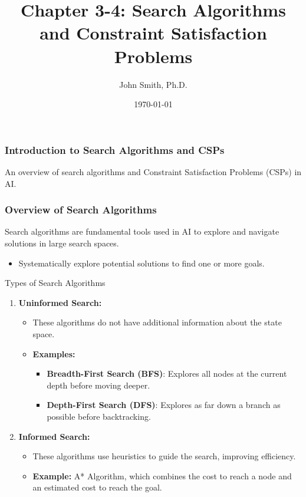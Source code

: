 \documentclass[aspectratio=169]{beamer}
\title[Chapter 3-4]{Chapter 3-4: Search Algorithms and Constraint Satisfaction Problems}
\author[J. Smith]{John Smith, Ph.D.}
\institute[University Name]{
  Department of Computer Science\\
  University Name\\
  \vspace{0.3cm}
  Email: email@university.edu\\
  Website: www.university.edu
}
\date{\today}
\begin{document}
\frame{\titlepage}

\begin{frame}[fragile]
    \frametitle{Introduction to Search Algorithms and CSPs}
    An overview of search algorithms and Constraint Satisfaction Problems (CSPs) in AI.
\end{frame}

\begin{frame}[fragile]
    \frametitle{Overview of Search Algorithms}
    Search algorithms are fundamental tools used in AI to explore and navigate solutions in large search spaces.
    \begin{itemize}
        \item Systematically explore potential solutions to find one or more goals.
    \end{itemize}
    
    \begin{block}{Types of Search Algorithms}
        \begin{enumerate}
            \item \textbf{Uninformed Search:}
                \begin{itemize}
                    \item These algorithms do not have additional information about the state space.
                    \item \textbf{Examples:}
                        \begin{itemize}
                            \item \textbf{Breadth-First Search (BFS)}: Explores all nodes at the current depth before moving deeper.
                            \item \textbf{Depth-First Search (DFS)}: Explores as far down a branch as possible before backtracking.
                        \end{itemize}
                \end{itemize}
            \item \textbf{Informed Search:}
                \begin{itemize}
                    \item These algorithms use heuristics to guide the search, improving efficiency.
                    \item \textbf{Example:} A* Algorithm, which combines the cost to reach a node and an estimated cost to reach the goal.
                \end{itemize}
        \end{enumerate}
    \end{block}
\end{frame}
\end{document}
